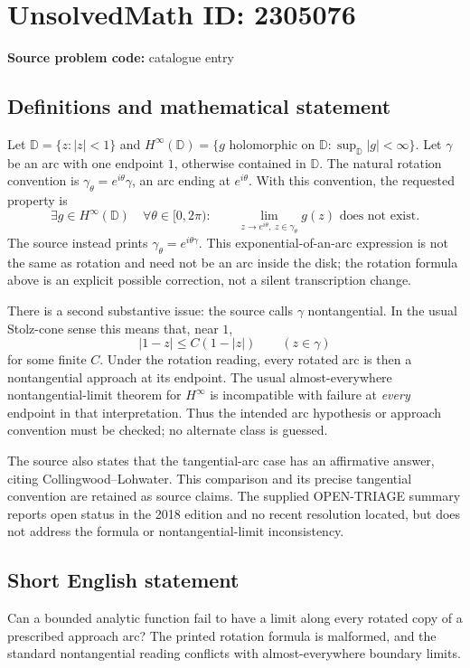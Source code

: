 \documentclass[11pt]{article}
\begin{document}
\section*{UnsolvedMath ID: 2305076}
\textbf{Source problem code:} catalogue entry
\subsection{Definitions and mathematical statement}
Let \(\mathbb D=\{z:|z|<1\}\) and \(H^\infty(\mathbb D)=\{g\text{ holomorphic on }\mathbb D:\sup_{\mathbb D}|g|<\infty\}\). Let \(\gamma\) be an arc with one endpoint \(1\), otherwise contained in \(\mathbb D\). The natural rotation convention is \(\gamma_\theta=e^{i\theta}\gamma\), an arc ending at \(e^{i\theta}\). With this convention, the requested property is
\[
\exists g\in H^\infty(\mathbb D)\quad\forall\theta\in[0,2\pi):\qquad
\lim_{z\to e^{i\theta},\ z\in\gamma_\theta}g(z)\text{ does not exist}.
\]
The source instead prints \(\gamma_\theta=e^{i\theta\gamma}\). This exponential-of-an-arc expression is not the same as rotation and need not be an arc inside the disk; the rotation formula above is an explicit possible correction, not a silent transcription change.

There is a second substantive issue: the source calls \(\gamma\) nontangential. In the usual Stolz-cone sense this means that, near \(1\),
\[
|1-z|\le C(1-|z|)\qquad(z\in\gamma)
\]
for some finite \(C\). Under the rotation reading, every rotated arc is then a nontangential approach at its endpoint. The usual almost-everywhere nontangential-limit theorem for \(H^\infty\) is incompatible with failure at \emph{every} endpoint in that interpretation. Thus the intended arc hypothesis or approach convention must be checked; no alternate class is guessed.

The source also states that the tangential-arc case has an affirmative answer, citing Collingwood--Lohwater. This comparison and its precise tangential convention are retained as source claims. The supplied OPEN-TRIAGE summary reports open status in the 2018 edition and no recent resolution located, but does not address the formula or nontangential-limit inconsistency.
\subsection{Short English statement}
Can a bounded analytic function fail to have a limit along every rotated copy of a prescribed approach arc? The printed rotation formula is malformed, and the standard nontangential reading conflicts with almost-everywhere boundary limits.
\end{document}
